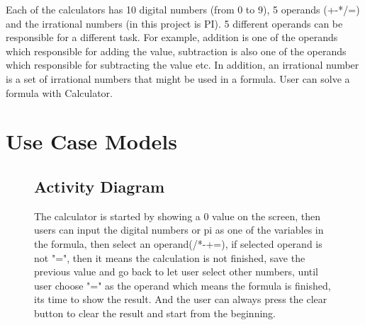 \documentclass[12pt]{report}
\begin{document}
{	
Each of the calculators has 10 digital numbers (from 0 to 9), 5 operands (+-*/=) and the irrational numbers (in this project is PI). 5 different operands can be responsible for a different task. For example, addition is one of the operands which responsible for adding the value, subtraction is also one of the operands which responsible for subtracting the value etc. In addition, an irrational number is a set of irrational numbers that might be used in a formula. User can solve a formula with Calculator. 

\chapter{Use Case Models} 

\begin{figure}[h!]
\section{Activity Diagram}
The calculator is started by showing a 0 value on the screen, then users can input the digital numbers or pi as one of the variables in the formula, then select an operand(/*-+=), if selected operand is not "=", then it means the calculation is not finished, save the previous value and  go back to let user select other numbers, until user choose "=" as the operand which means the formula is finished, its time to show the result. And the user can always press the clear button to clear the result and start from the beginning.


\end{figure}}
\end{document}
